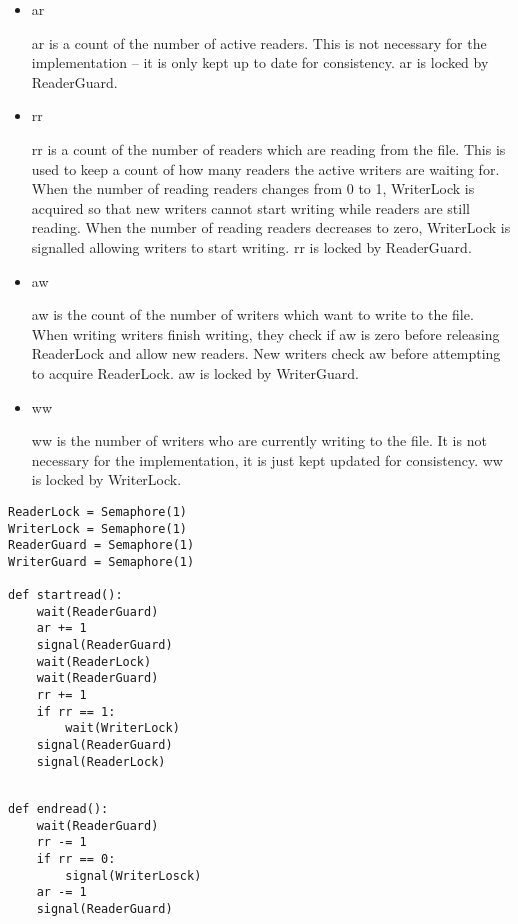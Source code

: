 \documentclass[10pt,\jkfside,a4paper]{article}
\begin{document}
\begin{itemize}

\item ar

ar is a count of the number of active readers. This is not necessary for the
implementation -- it is only kept up to date for consistency. ar is locked
by ReaderGuard.

\item rr

rr is a count of the number of readers which are reading from the file. This
is used to keep a count of how many readers the active writers are waiting for.
When the number of reading readers changes from 0 to 1, WriterLock is
acquired so that new writers cannot start writing while readers are still
reading. When the number of reading readers decreases to zero, WriterLock is
signalled allowing writers to start writing. rr is locked by ReaderGuard.

\item aw

aw is the count of the number of writers which want to write to the file.
When writing writers finish writing, they check if aw is zero before releasing
ReaderLock and allow new readers. New writers check aw before attempting to
acquire ReaderLock. aw is locked by WriterGuard.

\item ww

ww is the number of writers who are currently writing to the file. It is not
necessary for the implementation, it is just kept updated for consistency.
ww is locked by WriterLock.

\end{itemize}

\begin{lstlisting}
ReaderLock = Semaphore(1)
WriterLock = Semaphore(1)
ReaderGuard = Semaphore(1)
WriterGuard = Semaphore(1)

def startread():
	wait(ReaderGuard)
	ar += 1
	signal(ReaderGuard)
	wait(ReaderLock)
	wait(ReaderGuard)
	rr += 1
	if rr == 1:
		wait(WriterLock)
	signal(ReaderGuard)
	signal(ReaderLock)

\end{lstlisting}

\begin{lstlisting}

def endread():
	wait(ReaderGuard)
	rr -= 1
	if rr == 0:
		signal(WriterLosck)
	ar -= 1
	signal(ReaderGuard)

\end{lstlisting}
\end{document}
